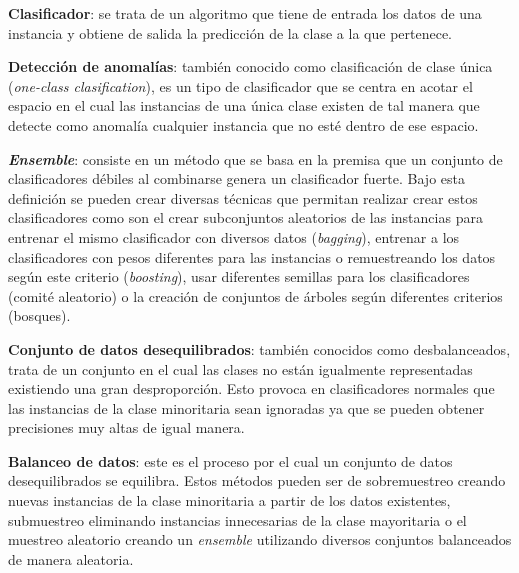\textbf{Clasificador}: se trata de un algoritmo que tiene de entrada los datos de una instancia y obtiene de salida la predicción de la clase a la que pertenece.

\textbf{Detección de anomalías}: también conocido como clasificación de clase única (\textit{one-class clasification}), es un tipo de clasificador que se centra en acotar el espacio en el cual las instancias de una única clase existen de tal manera que detecte como anomalía cualquier instancia que no esté dentro de ese espacio.~\cite{wiki:ooc}

\textbf{\textit{Ensemble}}: consiste en un método que se basa en la premisa que un conjunto de clasificadores débiles al combinarse genera un clasificador fuerte. Bajo esta definición se pueden crear diversas técnicas que permitan realizar crear estos clasificadores como son el crear subconjuntos aleatorios de las instancias para entrenar el mismo clasificador con diversos datos (\textit{bagging}), entrenar a los clasificadores con pesos diferentes para las instancias o remuestreando los datos según este criterio (\textit{boosting}), usar diferentes semillas para los clasificadores (comité aleatorio) o la creación de conjuntos de árboles según diferentes criterios (bosques).~\cite{ubu:mineria3}

\textbf{Conjunto de datos desequilibrados}: también conocidos como desbalanceados, trata de un conjunto en el cual las clases no están igualmente representadas existiendo una gran desproporción. Esto provoca en clasificadores normales que las instancias de la clase minoritaria sean ignoradas ya que se pueden obtener precisiones muy altas de igual manera.

\textbf{Balanceo de datos}: este es el proceso por el cual un conjunto de datos desequilibrados se equilibra. Estos métodos pueden ser de sobremuestreo creando nuevas instancias de la clase minoritaria a partir de los datos existentes, submuestreo eliminando instancias innecesarias de la clase mayoritaria o el muestreo aleatorio creando un \textit{ensemble} utilizando diversos conjuntos balanceados de manera aleatoria.~\cite{diez2015random, diez2015diversity, galar2012review}